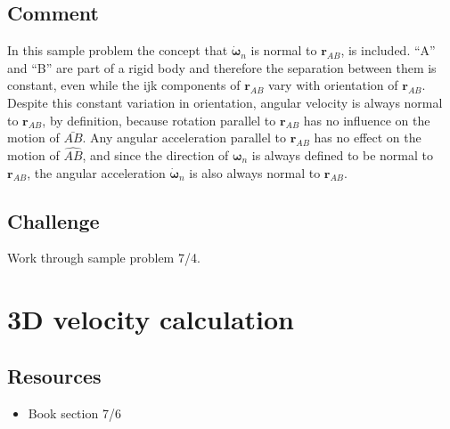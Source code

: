 \subsection*{Comment}
In this sample problem the concept that $\bm{\dot{\omega}}_n$ is normal to $\bm{r}_{AB}$,
is included. ``A'' and ``B'' are part of a rigid body and therefore the separation between them is constant, even while the ijk components of $\bm{r}_{AB}$ vary with orientation of $\bm{r}_{AB}$. Despite this constant variation in orientation, angular velocity is always normal to $\bm{r}_{AB}$, by definition, because rotation parallel to $\bm{r}_{AB}$ has no influence on the motion of $\bar{AB}$. Any angular acceleration parallel to $\bm{r}_{AB}$ has no effect on the motion of $\hat{AB}$, and since the direction of $\bm{\omega}_n$ is always defined to be normal to $\bm{r}_{AB}$, the angular acceleration $\bm{\dot{\omega}}_n$ is also always normal to $\bm{r}_{AB}$.

\subsection*{Challenge}
Work through sample problem 7/4.




\newpage
\section{3D velocity calculation}

\subsection*{Resources}
\begin{itemize}
    \item Book section 7/6
\end{itemize}

